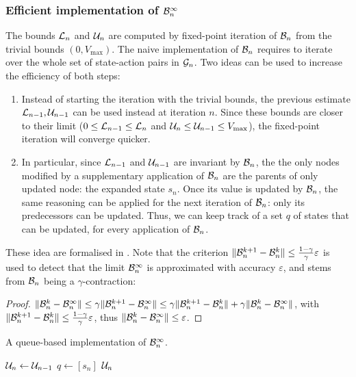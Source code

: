 \subsubsection{Efficient implementation of $\mathcal{B}_n^\infty$}

The bounds $\mathcal{L}_n$ and $\mathcal{U}_n$ are computed by fixed-point iteration of $\mathcal{B}_n$ from the trivial bounds $(0,V_{\max})$. The naive implementation of $\mathcal{B}_n$ requires to iterate over the whole set of state-action pairs in $\mathcal{G}_n$. 
Two ideas can be used to increase the efficiency of both steps:
\begin{enumerate}[label=(\roman*)]
	\item Instead of starting the iteration with the trivial bounds, the previous estimate $\mathcal{L}_{n-1}, \mathcal{U}_{n-1}$ can be used instead at iteration $n$. Since these bounds are closer to their limit ($0\leq \mathcal{L}_{n-1}\leq \mathcal{L}_n$ and $\mathcal{U}_n\leq \mathcal{U}_{n-1} \leq V_{\max}$), the fixed-point iteration will converge quicker.
	\item In particular, since $\mathcal{L}_{n-1}$ and $\mathcal{U}_{n-1}$ are invariant by $\mathcal{B}_n$, the the only nodes modified by a supplementary application of $\mathcal{B}_n$ are the parents of only updated node: the expanded state $s_n$. Once its value is updated by $\mathcal{B}_n$, the same reasoning can be applied for the next iteration of $\mathcal{B}_n$: only its predecessors can be updated. Thus, we can keep track of a set $q$ of states that can be updated, for every application of $\mathcal{B}_n$.
\end{enumerate}
These idea are formalised in . Note that the criterion $\|\mathcal{B}_n^{k+1} - \mathcal{B}_n^k\| \leq \frac{1-\gamma}{\gamma}\varepsilon$ is used to detect that the limit $\mathcal{B}_n^\infty$ is approximated with accuracy $\varepsilon$, and stems from $\mathcal{B}_n$ being a $\gamma$-contraction:
\begin{proof}
	$\|\mathcal{B}_n^k - \mathcal{B}_n^\infty\| \leq \gamma\| \mathcal{B}_n^{k+1} - \mathcal{B}_n^\infty\| \leq \gamma \|\mathcal{B}_n^{k+1} - \mathcal{B}_n^{k}\| + \gamma \|\mathcal{B}_n^{k} - \mathcal{B}_n^\infty\|$, with $\| \mathcal{B}_n^{k+1} - \mathcal{B}_n^{k}\| \leq \frac{1-\gamma}{\gamma}\varepsilon$, thus $\|\mathcal{B}_n^{k} - \mathcal{B}_n^\infty\| \leq \varepsilon$.
	\end{proof}

\begin{algorithm}
	\caption{A queue-based implementation of $\mathcal{B}_n^\infty$.}
	\label{alg:queue-b-inf}
	\DontPrintSemicolon
	$\mathcal{U}_n \gets \mathcal{U}_{n-1}$\;
	$q\gets [s_n]$\;
	\Return $\mathcal{U}_n$\;
\end{algorithm}


